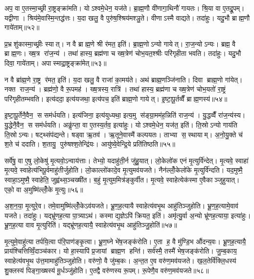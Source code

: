 अप॒ वा ए॒तस्मा॒च्छ्री रा॒ष्ट्रङ्क्रा॑मति। योऽश्वमे॒धेन॒ यज॑ते। ब्रा॒ह्म॒णौ वी॑णागा॒थिनौ॑ गायतः। श्रि॒या वा ए॒तद्रू॒पम्। यद्वीणा। श्रिय॑मे॒वास्मि॒न्तद्ध॑त्तः। य॒दा खलु॒ वै पुरु॑ष॒श्श्रिय॑मश्ञु॒ते। वीणाऽस्मै वाद्यते। तदा॑हुः। यदु॒भौ ब्राह्म॒णौ गाये॑ताम्॥५२॥

प्र॒भ्रशु॑कास्मा॒च्छ्रीः स्यात्। न वै ब्राह्म॒णे श्री र॑मत॒ इति॑। ब्रा॒ह्म॒णोऽन्यो गायेत्। रा॒ज॒न्योऽन्यः। ब्रह्म॒ वै ब्राह्म॒णः। ख्ष॒त्र रा॑ज॒न्य॑। तथा॑ हास्य॒ ब्रह्म॑णा च ख्ष॒त्रेण॑ चोभ॒यत॒श्श्रीः परि॑गृहीता भवति। तदा॑हुः। यदु॒भौ दिवा॒ गाये॑ताम्। अपास्माद्रा॒ष्ट्रङ्क्रा॑मेत्॥५३॥

न वै ब्रा॑ह्म॒णे रा॒ष्ट्र र॑मत॒ इति॑। य॒दा खलु॒ वै राजा॑ का॒मय॑ते। अथ॑ ब्राह्म॒णञ्जि॑नाति। दिवा ब्राह्म॒णो गा॑येत्। नक्त राज॒न्य॑। ब्रह्म॑णो॒ वै रू॒पमह॑। ख्ष॒त्रस्य॒ रात्रि॑। तथा॑ हास्य॒ ब्रह्म॑णा च ख्ष॒त्रेण॑ चोभ॒यतो॑ रा॒ष्ट्रं परि॑गृहीतम्भवति। इत्य॑ददा॒ इत्य॑यजथा॒ इत्य॑पच॒ इति॑ ब्राह्म॒णो गायेत्। इ॒ष्टा॒पू॒र्तव्वैँ ब्राह्म॒णस्य॑॥५४॥

इ॒ष्टा॒पू॒र्तेनै॒वैन॒ स सम॑र्धयति। इत्य॑जिना॒ इत्य॑युध्यथा॒ इत्य॒मु स॑ङ्ग्रा॒मम॑ह॒न्निति॑ राज॒न्य॑। यु॒द्धव्वैँ रा॑ज॒न्य॑स्य। यु॒द्धेनै॒वैन॒ स सम॑र्धयति। अकॢ॑प्ता॒ वा ए॒तस्य॒र्तव॒ इत्या॑हुः। योऽश्वमे॒धेन॒ यज॑त॒ इति॑। ति॒स्रोऽन्यो गाय॑ति ति॒स्रोऽन्यः। षट्थ्संप॑द्यन्ते। षड्वा ऋ॒तव॑। ऋ॒तूने॒वास्मै॑ कल्पयतः। ताभ्या स॒स्थायाम्। अ॒नो॒यु॒क्ते च॑ श॒ते च॑ ददाति। श॒तायु॒ पुरु॑षश्श॒तेन्द्रि॑यः। आयु॑ष्ये॒वेन्द्रि॒ये प्रति॑तिष्ठति॥५५॥\anuvakamend[गाये॑ताङ्क्रामेद्ब्राह्म॒णस्य॑ कल्पयतश्च॒त्वारि॑ च]

सर्वे॑षु॒ वा ए॒षु लो॒केषु॑ मृ॒त्यवो॒ऽन्वाय॑त्ताः। तेभ्यो॒ यदाहु॑ती॒र्न जु॑हु॒यात्। लो॒केलो॑क एनं मृ॒त्युर्वि॑न्देत्। मृ॒त्यवे॒ स्वाहा॑ मृ॒त्यवे॒ स्वाहेत्य॑भिपू॒र्वमाहु॑तीर्जुहोति। लो॒काल्लो॑कादे॒व मृ॒त्युमव॑यजते। नैन॑ल्लोँ॒केलो॑के मृ॒त्युर्वि॑न्दति। यद॒मुष्मै॒ स्वाहा॒ऽमुष्मै॒ स्वाहेति॒ जुह्व॑थ्स॒ञ्चख्षी॑त। ब॒हुं मृ॒त्युम॒मित्र॑ङ्कुर्वीत। मृ॒त्यवे॒ स्वाहेत्येक॑स्मा ए॒वैकाञ्जुहुयात्। एको॒ वा अ॒मुष्मि॑ल्लोँ॒के मृ॒त्युः॥५६॥

अ॒श॒न॒या॒ मृ॒त्युरे॒व। तमे॒वामुष्मि॑ल्लोँ॒केऽव॑यजते। भ्रू॒ण॒ह॒त्यायै स्वाहेत्य॑वभृ॒थ आहु॑तिञ्जुहोति। भ्रू॒ण॒ह॒त्यामे॒वाव॑ यजते। तदा॑हुः। यद्भ्रू॑णह॒त्या पा॒त्र्याऽथ॑। कस्माद्य॒ज्ञेऽपि॑ क्रियत॒ इति॑। अमृ॑त्यु॒र्वा अ॒न्यो भ्रू॑णह॒त्याया॒ इत्या॑हुः। भ्रू॒ण॒ह॒त्या वाव मृ॒त्युरिति॑। यद्भ्रू॑णह॒त्यायै॒ स्वाहेत्य॑वभृ॒थ आहु॑तिञ्जु॒होति॑॥५७॥

मृ॒त्युमे॒वाहु॑त्या तर्पयि॒त्वा प॑रि॒पाण॑ङ्कृ॒त्वा। भ्रू॒ण॒घ्ने भे॑ष॒जङ्क॑रोति। ए॒ता ह॒ वै मु॑ण्डि॒भ औ॑दन्य॒वः। भ्रू॒ण॒ह॒त्यायै॒ प्राय॑श्चित्तिव्विँ॒दाञ्च॑कार। यो हा॒स्यापि॑ प्र॒जायां ब्राह्म॒ण हन्ति॑। सर्व॑स्मै॒ तस्मै॑ भेष॒जङ्क॑रोति। जु॒म्ब॒काय॒ स्वाहेत्य॑वभृ॒थ उ॑त्त॒मामाहु॑तिञ्जुहोति। वरु॑णो॒ वै जु॑म्ब॒कः। अ॒न्त॒त ए॒व वरु॑ण॒मव॑यजते। ख॒ल॒तेर्वि॑क्लि॒धस्य॑ शु॒क्लस्य॑ पिङ्गा॒ख्षस्य॑ मू॒र्धञ्जु॑होति। ए॒तद्वै वरु॑णस्य रू॒पम्। रू॒पेणै॒व वरु॑ण॒मव॑यजते॥५८॥\anuvakamend[लो॒के मृ॒त्युर्जु॒होति॑ मू॒र्धञ्जु॑होति॒ द्वे च॑]


